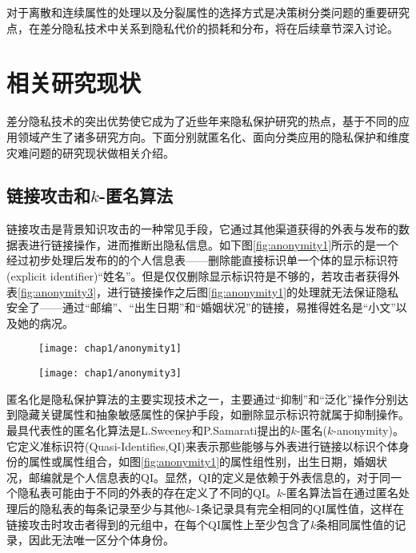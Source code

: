 对于离散和连续属性的处理以及分裂属性的选择方式是决策树分类问题的重要研究点，在差分隐私技术中关系到隐私代价的损耗和分布，将在后续章节深入讨论。

\section{相关研究现状} %

差分隐私技术的突出优势使它成为了近些年来隐私保护研究的热点，基于不同的应用领域产生了诸多研究方向。下面分别就匿名化、面向分类应用的隐私保护和维度灾难问题的研究现状做相关介绍。

\subsection{链接攻击和$k$-匿名算法}  %

链接攻击是背景知识攻击\cite{compounding attack}\cite{background attack}的一种常见手段，它通过其他渠道获得的外表与发布的数据表进行链接操作，进而推断出隐私信息。如下图\ref{fig:anonymity1}所示的是一个经过初步处理后发布的的个人信息表——删除能直接标识单一个体的显示标识符(explicit identifier)“姓名”。但是仅仅删除显示标识符是不够的，若攻击者获得外表\ref{fig:anonymity3}，进行链接操作之后图\ref{fig:anonymity1}的处理就无法保证隐私安全了——通过“邮编”、“出生日期”和“婚姻状况”的链接，易推得姓名是“小文”以及她的病况。

\begin{figure}[!htp]
	\centering
	\texttt{[image: chap1/anonymity1]}
\end{figure}

\begin{figure}[!htp]
	\centering
	\texttt{[image: chap1/anonymity3]}
\end{figure}


匿名化是隐私保护算法的主要实现技术之一，主要通过“抑制”和“泛化”操作分别达到隐藏关键属性和抽象敏感属性的保护手段，如删除显示标识符就属于抑制操作。最具代表性的匿名化算法是L.Sweeney和P.Samarati提出的$k$-匿名($k$-anonymity)\cite{k-anonymity}。它定义准标识符(Quasi-Identifies,QI)来表示那些能够与外表进行链接以标识个体身份的属性或属性组合，如图\ref{fig:anonymity1}的属性组{性别，出生日期，婚姻状况，邮编}就是个人信息表的QI。显然，QI的定义是依赖于外表信息的，对于同一个隐私表可能由于不同的外表的存在定义了不同的QI。$k$-匿名算法旨在通过匿名处理后的隐私表的每条记录至少与其他$k$-1条记录具有完全相同的QI属性值，这样在链接攻击时攻击者得到的元组中，在每个QI属性上至少包含了$k$条相同属性值的记录，因此无法唯一区分个体身份。

